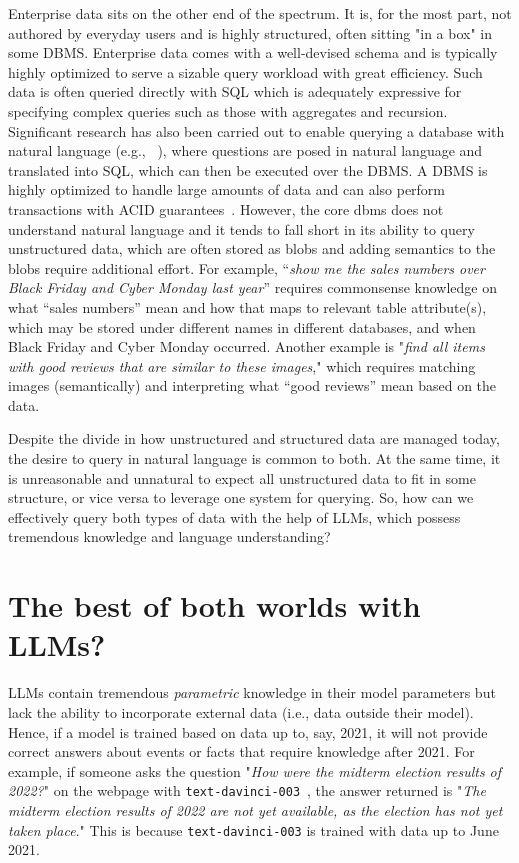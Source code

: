 \documentclass[11pt,dvipdfm]{article}
\begin{document}
Enterprise data sits on the other end of the spectrum. It is, for the most part, not authored by everyday users and is highly structured, often sitting "in a box" in some DBMS. Enterprise data comes with a well-devised schema and is typically highly optimized to serve a sizable query workload with great efficiency.
Such data is often queried directly with SQL which is adequately expressive for specifying complex queries such as those with aggregates and recursion. Significant research has also been carried out to enable querying a database with natural language (e.g., ~\cite{qi-etal2022rasat, scholak-etal-2021-picard}), where questions are posed in natural language and translated into SQL, which can then be executed over the DBMS. A DBMS is highly optimized to handle large amounts of data and can also perform transactions with ACID guarantees~\cite{acid}. However, the core dbms does not understand natural language and it tends to fall short in its ability to query unstructured data, which are often stored as blobs and adding semantics to the blobs require additional effort. For example, ``{\it show me the sales numbers over Black Friday and Cyber Monday last year}'' requires commonsense knowledge on what ``sales numbers'' mean and how that maps to relevant table attribute(s), which may be stored under different names in different databases, and when Black Friday and Cyber Monday occurred. Another example is "{\it find all items with good reviews that are similar to these images}," which requires matching images (semantically) and interpreting what ``good reviews'' mean based on the data.


Despite the divide in how unstructured and structured data are managed today, the desire to query in natural language is common to both. At the same time, it is unreasonable and unnatural to expect all unstructured data to fit in some structure, or vice versa to leverage one system for querying. So, how can we effectively query both types of data with the help of LLMs, which possess tremendous knowledge and language understanding? 

\section{The best of both worlds with LLMs?}

LLMs contain tremendous {\em parametric} knowledge in their model parameters but lack the ability to incorporate external data (i.e., data outside their model).   Hence, if a model is trained based on data up to, say, 2021, it will not provide correct answers about events or facts that require knowledge after 2021. For example, if someone asks the question "{\it How were the midterm election results of 2022?}" on the webpage with {\tt text-davinci-003}~\cite{openai-text-davinci-003}, the answer returned is "{\it The midterm election results of 2022 are not yet available, as the election has not yet taken place}." This is because {\tt text-davinci-003} is trained with data up to June 2021.
\end{document}
